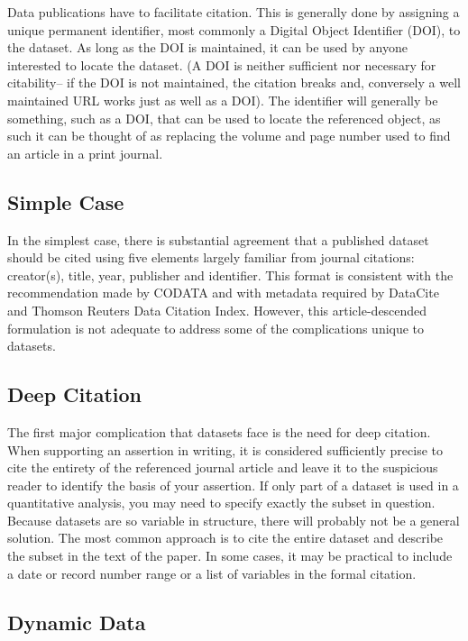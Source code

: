 \documentclass[10pt,a4paper,twocolumn]{article}
\begin{document}
Data publications have to facilitate citation. 
This is generally done by assigning a unique permanent identifier, most commonly a Digital Object Identifier (DOI), to the dataset. 
As long as the DOI is maintained, it can be used by anyone interested to locate the dataset. 
(A DOI is neither sufficient nor necessary for citability-- if the DOI is not maintained, the citation breaks and, conversely a well maintained URL works just as well as a DOI). 
The identifier will generally be something, such as a DOI, that can be used to locate the referenced object, as such it can be thought of as replacing the volume and page number used to find an article in a print journal.

\subsection*{Simple Case}\label{simple-case}

In the simplest case, there is substantial agreement that a published dataset should be cited using five elements largely familiar from journal citations: creator(s), title, year, publisher and identifier. 
This format is consistent with the recommendation made by CODATA\cite{socha_out_2013} and with metadata required by DataCite \cite{datacite_datacite_2013} and Thomson Reuters Data Citation Index. However, this article-descended formulation is not adequate to address some of the complications unique to datasets.

\subsection*{Deep Citation}\label{deep-citation}

The first major complication that datasets face is the need for deep citation. 
When supporting an assertion in writing, it is considered sufficiently precise to cite the entirety of the referenced journal article and leave it to the suspicious reader to identify the basis of your assertion. 
If only part of a dataset is used in a quantitative analysis, you may need to specify exactly the subset in question. 
Because datasets are so variable in structure, there will probably not be a general solution. 
The most common approach is to cite the entire dataset and describe the subset in the text of the paper. 
In some cases, it may be practical to include a date or record number range or a list of variables in the formal citation.

\subsection*{Dynamic Data}\label{dynamic-data}
\end{document}
